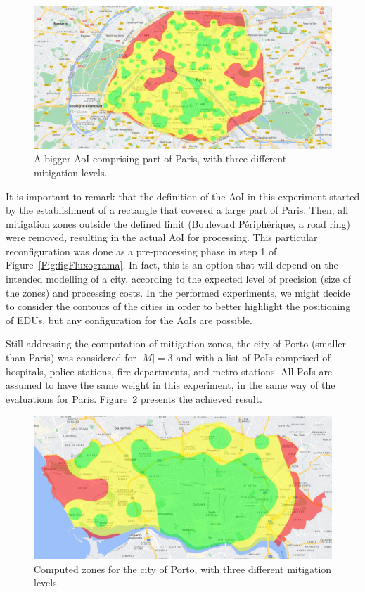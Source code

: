 \begin{refsection}
\begin{figure}[ht!]
  \centering
  \includegraphics[width=0.9\linewidth]{Chapters/3-EDUs/images/paris_M3.png}
  \caption{A bigger AoI comprising part of Paris, with three different mitigation levels.}\label{Fig:zones_paris_3}
\end{figure}

It is important to remark that the definition of the AoI in this experiment started by the establishment of a rectangle that covered a large part of Paris. Then, all mitigation zones outside the defined limit (Boulevard Périphérique, a road ring) were removed, resulting in the actual AoI for processing. This particular reconfiguration was done as a pre-processing phase in step 1 of Figure~\ref{Fig:figFluxograma}. In fact, this is an option that will depend on the intended modelling of a city, according to the expected level of precision (size of the zones) and processing costs. In the performed experiments, we might decide to consider the contours of the cities in order to better highlight the positioning of EDUs, but any configuration for the AoIs are possible.

Still addressing the computation of mitigation zones, the city of Porto (smaller than Paris) was considered for $|M|=3$ and with a list of PoIs comprised of hospitals, police stations, fire departments, and metro stations. All PoIs are assumed to have the same weight in this experiment, in the same way of the evaluations for Paris. Figure~\ref{Fig:zones_porto_3} presents the achieved result. 

\begin{figure}[ht!]
  \centering
  \includegraphics[width=0.9\linewidth]{Chapters/3-EDUs/images/porto_M3_no_weight.png}
  \caption{Computed zones for the city of Porto, with three different mitigation levels.}\label{Fig:zones_porto_3}
\end{figure}


\end{refsection}
